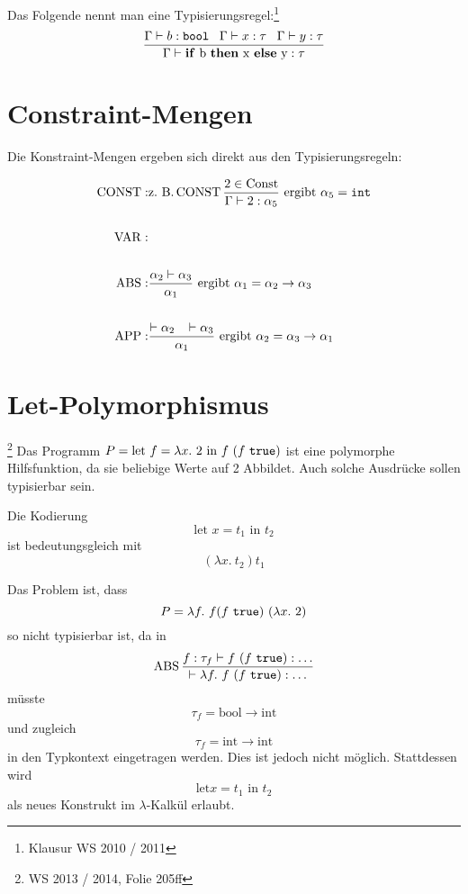 \begin{beispiel}[Typisierungsregel]%
	Das Folgende nennt man eine Typisierungsregel:\footnote{Klausur WS 2010 / 2011}
	\[\frac{\Gamma \vdash b: \text{\texttt{bool}}\;\;\; \Gamma \vdash x: \tau \;\;\; \Gamma \vdash y: \tau }{\Gamma \vdash \text{\textbf{if} b \textbf{then} x \textbf{else} y} : \tau}\]
\end{beispiel}

\section{Constraint-Mengen}
Die Konstraint-Mengen ergeben sich direkt aus den Typisierungsregeln:

    \begin{align*}
        \operatorname{CONST}:&\text{z.~B.} \operatorname{CONST} \frac{2 \in \text{Const}}{\Gamma \vdash 2 : \alpha_5} \text{ ergibt } \alpha_5 = \text{\texttt{int}}\\
               &\\
        \operatorname{VAR}:  &\\
               &\\
        \operatorname{ABS}:  &\frac{\alpha_2 \vdash \alpha_3}{\alpha_1} \text{ ergibt } \alpha_1 = \alpha_2 \rightarrow \alpha_3\\
               &\\
        \operatorname{APP}:  &\frac{\vdash \alpha_2 \;\;\; \vdash \alpha_3}{\alpha_1} \text{ ergibt } \alpha_2 = \alpha_3 \rightarrow \alpha_1\\
    \end{align*}

\section{Let-Polymorphismus}\footnote{WS 2013 / 2014, Folie 205ff}%
Das Programm $P = \text{let } f = \lambda x.\ 2 \text{ in } f\ (f\ \text{\texttt{true}})$
ist eine polymorphe Hilfsfunktion, da sie beliebige Werte auf 2 Abbildet.
Auch solche Ausdrücke sollen typisierbar sein.

Die Kodierung 
\[\text{let } x = t_1 \text{ in } t_2\]
ist bedeutungsgleich mit
\[(\lambda x.\ t_2) t_1\]

Das Problem ist, dass 
\[P = \lambda f. \ f (f\ \text{\texttt{true}})\ (\lambda x.\ 2)\]
so nicht typisierbar ist, da in
\[\ABS \frac{f: \tau_f \vdash f\ (f\ \text{\texttt{true}}): \dots}{\vdash \lambda f.\ f\ (f\ \text{\texttt{true}}): \dots}\]
müsste 
\[\tau_f = \text{bool} \rightarrow \text{int}\]
und zugleich
\[\tau_f = \text{int} \rightarrow \text{int}\]
in den Typkontext eingetragen werden. Dies ist jedoch nicht möglich. Stattdessen
wird 
\[\text{let} x = t_1 \text{ in } t_2\]
als neues Konstrukt im $\lambda$-Kalkül erlaubt.

